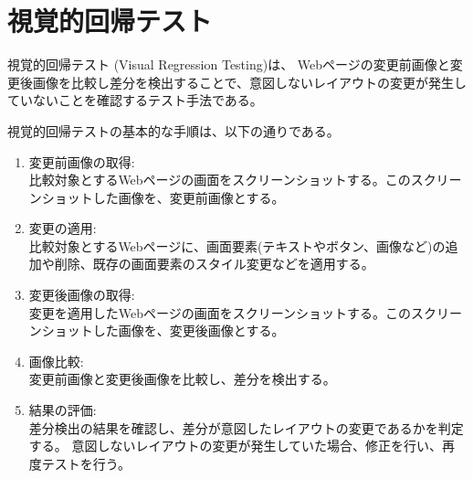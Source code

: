 \section{視覚的回帰テスト}\label{sec:vrt}
視覚的回帰テスト (Visual Regression Testing)\cite{VisualRegressionTesting}は、
Webページの変更前画像と変更後画像を比較し差分を検出することで、意図しないレイアウトの変更が発生していないことを確認するテスト手法である。\\
\par
視覚的回帰テストの基本的な手順は、以下の通りである。
\begin{enumerate}
      \setlength{\itemsep}{0pt}
            \setlength{\parsep}{0pt}
      \item 変更前画像の取得:\\
            比較対象とするWebページの画面をスクリーンショットする。このスクリーンショットした画像を、変更前画像とする。
      \item 変更の適用:\\
            比較対象とするWebページに、画面要素(テキストやボタン、画像など)の追加や削除、既存の画面要素のスタイル変更などを適用する。
      \item 変更後画像の取得:\\
            変更を適用したWebページの画面をスクリーンショットする。このスクリーンショットした画像を、変更後画像とする。
      \item 画像比較:\\
            変更前画像と変更後画像を比較し、差分を検出する。
      \item 結果の評価:\\
            差分検出の結果を確認し、差分が意図したレイアウトの変更であるかを判定する。
            意図しないレイアウトの変更が発生していた場合、修正を行い、再度テストを行う。
\end{enumerate}

